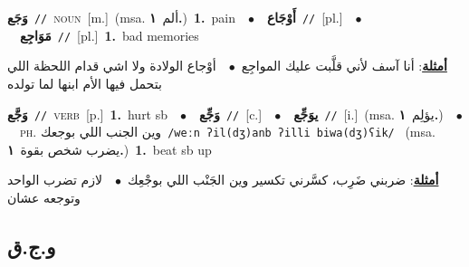 \documentclass[10pt,a4paper,twoside]{article} %
\begin{document}
\begin{multicols}{2}
{\setlength\topsep{0pt}\textbf{\foreignlanguage{arabic}{وَجَع}}\ {\color{gray}\texttt{//}\color{black}}\ \textsc{noun}\ [m.]\ \color{gray}(msa. \foreignlanguage{arabic}{ألم}~\foreignlanguage{arabic}{\textbf{١.}})\color{black}\ \textbf{1.}~pain\ \ $\bullet$\ \ \setlength\topsep{0pt}\textbf{\foreignlanguage{arabic}{أَوْجَاع}}\ {\color{gray}\texttt{//}\color{black}}\ [pl.]\ \ $\bullet$\ \ \setlength\topsep{0pt}\textbf{\foreignlanguage{arabic}{مَوَاجِع}}\ {\color{gray}\texttt{//}\color{black}}\ [pl.]\ \textbf{1.}~bad memories\  \begin{flushright}\color{gray}\foreignlanguage{arabic}{\textbf{\underline{\foreignlanguage{arabic}{أمثلة}}}: أنا آسف لأني قلَّبت عليك المواجِع\ $\bullet$\ \  أوْجاع الولادة ولا اشي قدام اللحظة اللي بتحمل فيها الأم ابنها لما تولده}\end{flushright}\color{black}} \vspace{2mm}

{\setlength\topsep{0pt}\textbf{\foreignlanguage{arabic}{وَجَّع}}\ {\color{gray}\texttt{//}\color{black}}\ \textsc{verb}\ [p.]\ \textbf{1.}~hurt sb\ \ $\bullet$\ \ \setlength\topsep{0pt}\textbf{\foreignlanguage{arabic}{وَجِّع}}\ {\color{gray}\texttt{//}\color{black}}\ [c.]\ \ $\bullet$\ \ \setlength\topsep{0pt}\textbf{\foreignlanguage{arabic}{يوَجِّع}}\ {\color{gray}\texttt{//}\color{black}}\ [i.]\ \color{gray}(msa. \foreignlanguage{arabic}{يؤلِم}~\foreignlanguage{arabic}{\textbf{١.}})\color{black}\ \ $\bullet$\ \ \textsc{ph.} \color{gray} \foreignlanguage{arabic}{وين الجنب اللي بوجعك}\color{black}\ {\color{gray}\texttt{/{\sffamily weːn ʔil(dʒ)anb ʔilli biwa(dʒ)ʕik}/}\color{black}}\ \color{gray} (msa. \foreignlanguage{arabic}{يضرب شخص بقوة}~\foreignlanguage{arabic}{\textbf{١.}})\color{black}\ \textbf{1.}~beat sb up\  \begin{flushright}\color{gray}\foreignlanguage{arabic}{\textbf{\underline{\foreignlanguage{arabic}{أمثلة}}}: ضربني ضَرِب، كسَّرني تكسير وين الجَنْب اللي بوجْعِك\ $\bullet$\ \  لازم تضرب الواحد وتوجعه عشان}\end{flushright}\color{black}} \vspace{2mm}

\vspace{-3mm}
\subsection*{\color{blue}\foreignlanguage{arabic}{و.ج.ق}\color{blue}{}} 


\end{multicols}
\end{document}
